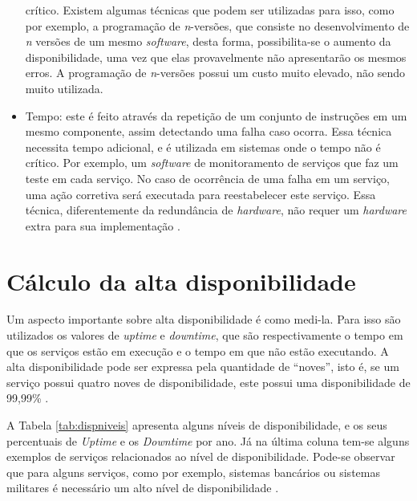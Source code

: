 \begin{itemize}
 crítico. Existem algumas técnicas que podem ser utilizadas para isso, como por exemplo, a programação de \textit{n}-versões, que consiste 
 no desenvolvimento de \textit{n} versões de um mesmo \textit{software}, desta forma, possibilita-se o aumento da disponibilidade, uma vez que 
 elas provavelmente não apresentarão os mesmos erros. A programação de \textit{n}-versões possui um custo muito elevado, não sendo muito 
 utilizada.
 \item Tempo: este é feito através da repetição de um conjunto de instruções em um mesmo componente, assim detectando uma falha caso ocorra. 
 Essa técnica necessita tempo adicional, e é utilizada em sistemas onde o tempo não é crítico. Por exemplo, um \textit{software} de 
 monitoramento de serviços que faz um teste em cada serviço. No caso de ocorrência de uma falha em um serviço, uma ação corretiva 
 será executada para reestabelecer este serviço. Essa técnica, diferentemente da redundância de \textit{hardware}, não requer um 
 \textit{hardware} extra para sua implementação \cite{costa2009}.
\end{itemize}

\section{Cálculo da alta disponibilidade}

Um aspecto importante sobre alta disponibilidade é como medi-la. Para isso são utilizados os valores de \textit{uptime} e \textit{downtime}, 
que são respectivamente o tempo em que os serviços estão em execução e o tempo em que não estão executando. A alta disponibilidade 
pode ser expressa pela quantidade de ``noves'', isto é, se um serviço possui quatro noves de disponibilidade, este possui uma 
disponibilidade de 99,99\% \cite{pereirafilho2004}.

A Tabela \ref{tab:dispniveis} apresenta alguns níveis de disponibilidade, e os seus percentuais de \textit{Uptime} e os \textit{Downtime} por ano. 
Já na última coluna tem-se alguns exemplos de serviços relacionados ao nível de disponibilidade. Pode-se observar que para alguns serviços, 
como por exemplo, sistemas bancários ou sistemas militares é necessário um alto nível de disponibilidade \cite{pereirafilho2004}.

